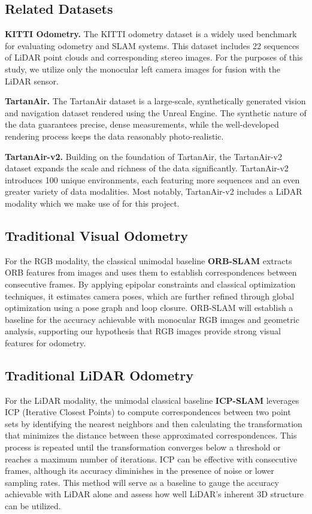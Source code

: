 \documentclass[11pt,a4paper]{article}
\begin{document}
\subsection{Related Datasets} 
\noindent \textbf{KITTI Odometry.}
The KITTI odometry dataset \cite{KITTI} is a widely used benchmark for evaluating odometry and SLAM systems. This dataset includes 22 sequences of LiDAR point clouds and corresponding stereo images. For the purposes of this study, we utilize only the monocular left camera images for fusion with the LiDAR sensor.

\noindent \textbf{TartanAir.}
The TartanAir dataset \cite{tartanair} is a large-scale, synthetically generated vision and navigation dataset rendered using the Unreal Engine. The synthetic nature of the data guarantees precise, dense measurements, while the well-developed rendering process keeps the data reasonably photo-realistic.

\noindent \textbf{TartanAir-v2.}
Building on the foundation of TartanAir, the TartanAir-v2 dataset expands the scale and richness of the data significantly. TartanAir-v2 introduces 100 unique environments, each featuring more sequences and an even greater variety of data modalities. Most notably, TartanAir-v2 includes a LiDAR modality which we make use of for this project.

\subsection{Traditional Visual Odometry}

For the RGB modality, the classical unimodal baseline \textbf{ORB-SLAM} \cite{orb-slam} extracts ORB features from images and uses them to establish correspondences between consecutive frames. By applying epipolar constraints and classical optimization techniques, it estimates camera poses, which are further refined through global optimization using a pose graph and loop closure. ORB-SLAM will establish a baseline for the accuracy achievable with monocular RGB images and geometric analysis, supporting our hypothesis that RGB images provide strong visual features for odometry.

\subsection{Traditional LiDAR Odometry}
For the LiDAR modality, the unimodal classical baseline \textbf{ICP-SLAM} \cite{KISS-ICP} leverages ICP (Iterative Closest Points) to compute correspondences between two point sets by identifying the nearest neighbors and then calculating the transformation that minimizes the distance between these approximated correspondences. This process is repeated until the transformation converges below a threshold or reaches a maximum number of iterations. ICP can be effective with consecutive frames, although its accuracy diminishes in the presence of noise or lower sampling rates. This method will serve as a baseline to gauge the accuracy achievable with LiDAR alone and assess how well LiDAR’s inherent 3D structure can be utilized.
\end{document}

